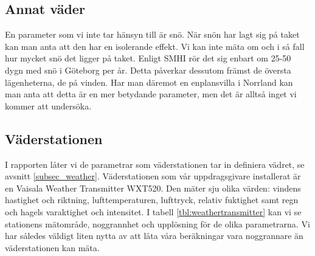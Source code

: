 
\subsection{Annat väder}
En parameter som vi inte tar hänsyn till är snö. När snön har lagt sig på taket kan man anta att den har en isolerande effekt. Vi kan inte mäta om och i så fall hur mycket snö det ligger på taket. Enligt SMHI %
rör det sig enbart om 25-50 dygn med snö i Göteborg per år. Detta påverkar dessutom främst de översta lägenheterna, de på vinden. Har man däremot en enplansvilla i Norrland kan man anta att detta är en mer betydande parameter, men det är alltså inget vi kommer att undersöka.

\subsection{Väderstationen}
\label{subsec_weathertransmitter}
I rapporten låter vi de parametrar som väderstationen tar in definiera vädret, se avsnitt \ref{subsec_weather}. Väderstationen som vår uppdragsgivare installerat är en Vaisala Weather Transmitter WXT520. Den mäter sju olika värden: vindens hastighet och riktning, lufttemperaturen, lufttryck, relativ fuktighet samt regn och hagels varaktighet och intensitet. I tabell \ref{tbl:weathertransmitter} kan vi se stationens mätområde, noggrannhet och upplösning för de olika parametrarna. Vi har således väldigt liten nytta av att låta våra beräkningar vara noggrannare än väderstationen kan mäta.

